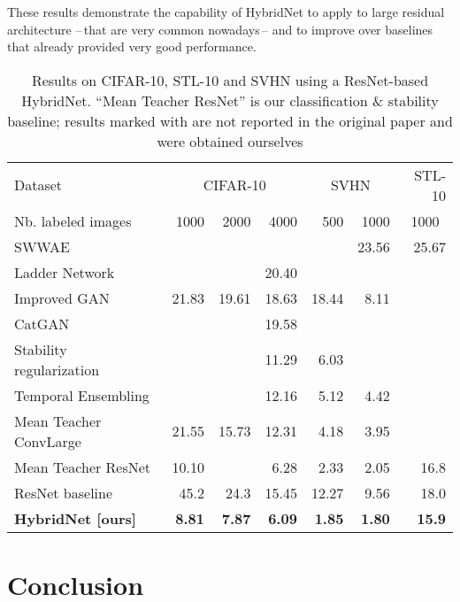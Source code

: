 \documentclass[runningheads]{llncs}
\begin{document}
These results demonstrate the capability of HybridNet to apply to large residual architecture --\,that are very common nowadays\,-- and to improve over baselines that already provided very good performance.

\begin{table}[tb]
  \setlength{\tabcolsep}{4pt}
  \caption{Results on CIFAR-10, STL-10 and SVHN using a ResNet-based HybridNet. ``Mean Teacher ResNet'' is our classification \& stability baseline; results marked with  are not reported in the original paper and were obtained ourselves }
  \label{table:cifar10}
  \centering
  \begin{tabular}{@{}lrrrrrr@{}}
    \toprule
    Dataset                                    & \multicolumn{3}{c}{CIFAR-10} & \multicolumn{2}{c}{SVHN} & STL-10 \\
    \cmidrule{2-7}
    Nb. labeled images & 1000  & 2000 & 4000 & 500 & 1000 & \multicolumn{1}{c}{1000} \\
    \midrule
    SWWAE~\cite{Zhao2016a}                         &   &   &   & & 23.56 & 25.67 \\
    Ladder Network~\cite{Rasmus2015}                  &&       & 20.40      \\
    Improved GAN~\cite{Salimans2016}              & 21.83 & 19.61 & 18.63 & 18.44 & 8.11 &  \\
    CatGAN~\cite{Springenberg2015}                    &&       & 19.58      \\
    Stability regularization~\cite{Sajjadi2016}    &&       & 11.29  & 6.03 & &      \\
    Temporal Ensembling~\cite{Laine2016}           &&       & 12.16 & 5.12 & 4.42  \\
    Mean Teacher ConvLarge~\cite{Tarvainen2017}              & 21.55 & 15.73 & 12.31 & 4.18 & 3.95 \\
    Mean Teacher ResNet~\cite{Tarvainen2017}          & 10.10  &      & 6.28 & 2.33 & 2.05 & 16.8        \\
    \cmidrule{1-7}
    ResNet baseline~\cite{Gastaldi2017}						 & 45.2 & 24.3 & 15.45 & 12.27 & 9.56 & 18.0  \\
    \textbf{HybridNet [ours]}  & \textbf{8.81} & \textbf{7.87} & \textbf{6.09} & \textbf{1.85} & \textbf{1.80} & \textbf{15.9} \\
    \bottomrule
  \end{tabular}
\end{table}

\section{Conclusion}
\end{document}
